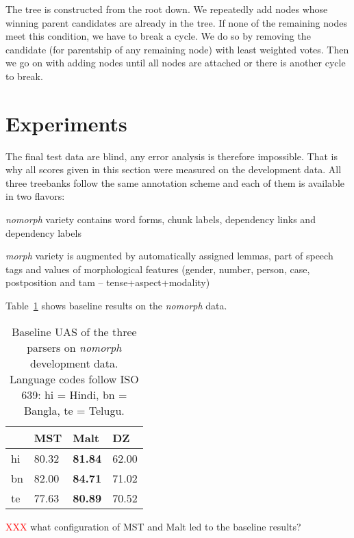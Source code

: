 \documentclass[11pt]{article}
\def\Tref#1{Table~\ref{#1}}
\newcommand{\XXX}{\textcolor{red}{XXX }} %
\begin{document}
The tree is constructed from the root down. We repeatedly add nodes whose winning parent candidates are already in the tree. If none of the remaining nodes meet this condition, we have to break a cycle. We do so by removing the candidate (for parentship of any remaining node) with least weighted votes. Then we go on with adding nodes until all nodes are attached or there is another cycle to break.

\section{Experiments}
\label{sec:experiments}

The final test data are blind, any error analysis is therefore impossible. That is why all scores given in this section were measured on the development data. All three treebanks follow the same annotation scheme and each of them is available in two flavors:

\begin{compactitem}
\item \textit{nomorph} variety contains word forms, chunk labels, dependency links and dependency labels
\item \textit{morph} variety is augmented by automatically assigned lemmas, part of speech tags and values of morphological features (gender, number, person, case, postposition and tam -- tense+aspect+modality)
\end{compactitem}

\Tref{tab:baseline} shows baseline results on the \textit{nomorph} data.

\begin{table}[ht]
\begin{centering}
\begin{tabular}{l|l|l|l}
& \textbf{MST} & \textbf{Malt} & \textbf{DZ} \\
\hline
hi & 80.32 & \textbf{81.84} & 62.00\\
bn & 82.00 & \textbf{84.71} & 71.02\\
te & 77.63 & \textbf{80.89} & 70.52\\
\end{tabular}
\caption{Baseline UAS of the three parsers on \textit{nomorph} development data. Language codes follow ISO 639: hi = Hindi, bn = Bangla, te = Telugu.}
\label{tab:baseline}
\end{centering}
\end{table}

\XXX what configuration of MST and Malt led to the baseline results?
\end{document}

